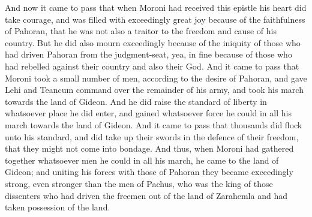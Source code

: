 \bchapter
\bverse \iffalse And now it came to pass that when Moroni had received this epistle his heart did take courage, and was filled with exceedingly great joy because of the faithfulness of Pahoran, that he was not also a traitor to the freedom and cause of his country. \fi
And now it came to pass that when Moroni had received this epistle his heart did take courage, and was filled with exceedingly great joy because of the faithfulness of Pahoran, that he was not also a traitor to the freedom and cause of his country.
\bverse \iffalse But he did also mourn exceedingly because of the iniquity of those who had driven Pahoran from the judgment-seat, yea, in fine because of those who had rebelled against their country and also their God. \fi
But he did also mourn exceedingly because of the iniquity of those who had driven Pahoran from the judgment-seat, yea, in fine because of those who had rebelled against their country and also their God.
\bverse \iffalse And it came to pass that Moroni took a small number of men, according to the desire of Pahoran, and gave Lehi and Teancum command over the remainder of his army, and took his march towards the land of Gideon. \fi
And it came to pass that Moroni took a small number of men, according to the desire of Pahoran, and gave Lehi and Teancum command over the remainder of his army, and took his march towards the land of Gideon.
\bverse \iffalse And he did raise the standard of liberty in whatsoever place he did enter, and gained whatsoever force he could in all his march towards the land of Gideon. \fi
And he did raise the standard of liberty in whatsoever place he did enter, and gained whatsoever force he could in all his march towards the land of Gideon.
\bverse \iffalse And it came to pass that thousands did flock unto his standard, and did take up their swords in the defence of their freedom, that they might not come into bondage. \fi
And it came to pass that thousands did flock unto his standard, and did take up their swords in the defence of their freedom, that they might not come into bondage.
\bverse \iffalse And thus, when Moroni had gathered together whatsoever men he could in all his march, he came to the land of Gideon; and uniting his forces with those of Pahoran they became exceedingly strong, even stronger than the men of Pachus, who was the king of those dissenters who had driven the freemen out of the land of Zarahemla and had taken possession of the land. \fi
And thus, when Moroni had gathered together whatsoever men he could in all his march, he came to the land of Gideon; and uniting his forces with those of Pahoran they became exceedingly strong, even stronger than the men of Pachus, who was the king of those dissenters who had driven the freemen out of the land of Zarahemla and had taken possession of the land.
